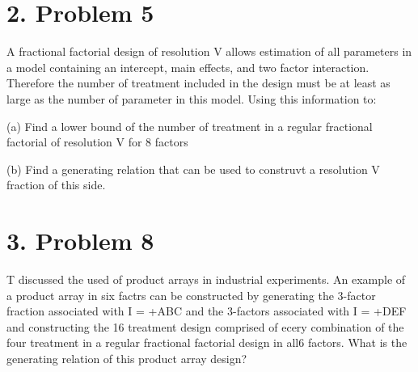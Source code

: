 \documentclass{article}\usepackage[]{graphicx}\usepackage[]{color}
\begin{document}
\section*{2. Problem 5}
A fractional factorial design of resolution V allows estimation of all parameters in a model containing an intercept, main effects, and two factor interaction. Therefore the number of treatment included in the design must be at least as large as the number of parameter in this model. Using this information to:

(a) Find a lower bound of the number of treatment in a regular fractional factorial of resolution V for 8 factors

(b) Find a generating relation that can be used to construvt a resolution V fraction of this side.

\section*{3. Problem 8}

T discussed the used of product arrays in industrial experiments. An example of a product array in six factrs can be constructed by generating the 3-factor fraction associated with I = +ABC and the 3-factors associated with I = +DEF and constructing the 16 treatment design comprised of ecery combination of the four treatment in a regular fractional factorial design in all6 factors. What is the generating relation of this product array design?
\end{document}
